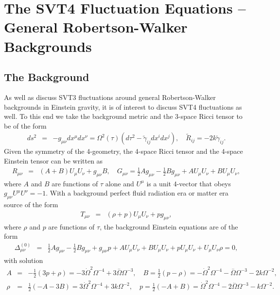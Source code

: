 \documentclass[aps,onecolumn,10pt]{revtex4}
\numberwithin{equation}{section}
\numberwithin{equation}{section}
\begin{document}
\section{The SVT4 Fluctuation Equations --  General Robertson-Walker Backgrounds}
\label{S12}
\subsection{The Background}

As well as discuss SVT3 fluctuations around general Robertson-Walker backgrounds in Einstein gravity,  it is of interest to discuss SVT4 fluctuations  as well. To this end we take the background metric and the 3-space Ricci tensor to be of the form 
%
\begin{eqnarray}
ds^2 &=&-g_{\mu\nu}dx^{\mu}dx^{\nu}=\Omega^2(\tau)\left(d\tau^2 -\tilde{\gamma}_{ij} dx^i dx^j\right),\quad \tilde{R}_{ij} = -2k \tilde{\gamma}_{ij}.
\label{12.1}
\end{eqnarray}
%
Given the symmetry of the 4-geometry, the 4-space Ricci tensor and the 4-space Einstein tensor can be written as 
%
\begin{eqnarray}
R_{\mu\nu} &=& (A+B)U_\mu U_\nu + g_{\mu\nu}B,\quad G_{\mu\nu}= \tfrac{1}{2} A g_{\mu \nu } -  \tfrac{1}{2} B g_{\mu \nu } + A U_{\mu } U_{\nu } + B U_{\mu } U_{\nu },
\label{12.2}
\end{eqnarray}
%
where $A$ and $B$ are functions of $\tau$ alone and $U^{\mu}$ is a unit 4-vector that obeys $g_{\mu\nu}U^{\mu}U^{\nu}=-1$. With a background perfect fluid radiation era or matter era source of the form
%
\begin{eqnarray} 
T_{\mu\nu} &=& (\rho+p)U_\mu U_\nu +  p g_{\mu\nu},
\label{12.3}
\end{eqnarray}
%
where $\rho$ and $p$ are functions of $\tau$, the background Einstein equations are of the form
%
\begin{eqnarray}
\Delta_{\mu\nu}^{(0)}&=&\tfrac{1}{2} A g_{\mu \nu } -  \tfrac{1}{2} B g_{\mu \nu } + g_{\mu \nu } p + A U_{\mu } U_{\nu } + B U_{\mu } U_{\nu } + p U_{\mu } U_{\nu } + U_{\mu } U_{\nu } \rho=0,
\label{12.4}
\end{eqnarray}
%
with solution 
%
\begin{eqnarray}
A &=& -\tfrac{1}{2} (3p+\rho)= -3 \dot{\Omega}^2 \Omega^{-4} + 3 \overset{..}{\Omega} \Omega^{-3}, \quad B= \tfrac{1}{2}(p-\rho)=- \dot{\Omega}^2 \Omega^{-4} -  \overset{..}{\Omega} \Omega^{-3} - 2 k \Omega^{-2}, 
\nonumber\\
\rho &=& \tfrac{1}{2} (- A - 3 B)= 3 \dot{\Omega}^2 \Omega^{-4} + 3 k \Omega^{-2},\quad p = \tfrac{1}{2} (- A + B)
= \dot{\Omega}^2 \Omega^{-4} - 2 \overset{..}{\Omega} \Omega^{-3} -  k \Omega^{-2}.
\label{12.5}
\end{eqnarray}
%
\end{document}
